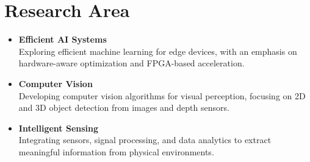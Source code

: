 \section{Research Area}

\begin{itemize}
  \item \textbf{Efficient AI Systems}\\
  Exploring efficient machine learning for edge devices, with an emphasis on hardware-aware optimization and FPGA-based acceleration.
  \item \textbf{Computer Vision}\\
  Developing computer vision algorithms for visual perception, focusing on 2D and 3D object detection from images and depth sensors.
  \item \textbf{Intelligent Sensing}\\
  Integrating sensors, signal processing, and data analytics to extract meaningful information from physical environments.
\end{itemize}
